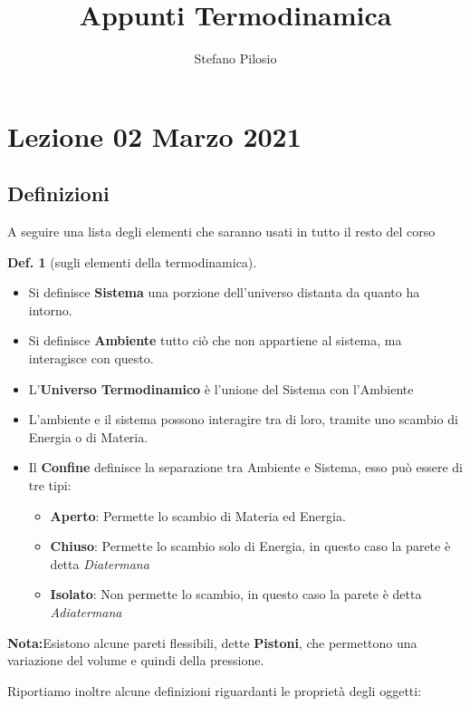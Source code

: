\documentclass[a4paper]{article}
\theoremstyle{definition}
\newtheorem{defin}{Def.}
\theoremstyle{plain}
\newcommand {\bd} [1] {\textbf{#1}}
\begin{document}
\author{Stefano Pilosio}
\title {Appunti Termodinamica}
\maketitle


\section{Lezione 02 Marzo 2021}
\subsection{Definizioni}

A seguire una lista degli elementi che saranno usati in tutto il resto del corso

\begin{defin}[sugli elementi della termodinamica]\hfill
\begin{itemize} 
    \item Si definisce \bd{Sistema} una porzione dell'universo distanta da quanto ha intorno.
    \item Si definisce \bd{Ambiente} tutto ciò che non appartiene al sistema, ma interagisce con questo.
    \item L'\bd{Universo Termodinamico} è l'unione del Sistema con l'Ambiente 
    \item L'ambiente e il sistema possono interagire tra di loro, tramite uno scambio di Energia o di Materia. 
    \item Il \bd{Confine} definisce la separazione tra Ambiente e Sistema, esso può essere di tre tipi:
    \begin{itemize}
        \item \bd{Aperto}: Permette lo scambio di Materia ed Energia.
        \item \bd{Chiuso}: Permette lo scambio solo di Energia, in questo caso la parete è  detta \emph{Diatermana}
        \item \bd{Isolato}: Non permette lo scambio, in questo caso la parete è detta \emph{Adiatermana}
    \end{itemize} 
\end{itemize}
\end{defin}

\bd{Nota:}Esistono alcune pareti flessibili, dette \bd{Pistoni},
 che permettono una variazione del volume e quindi della pressione. 

Riportiamo inoltre alcune definizioni riguardanti le proprietà degli oggetti:
\end{document}
